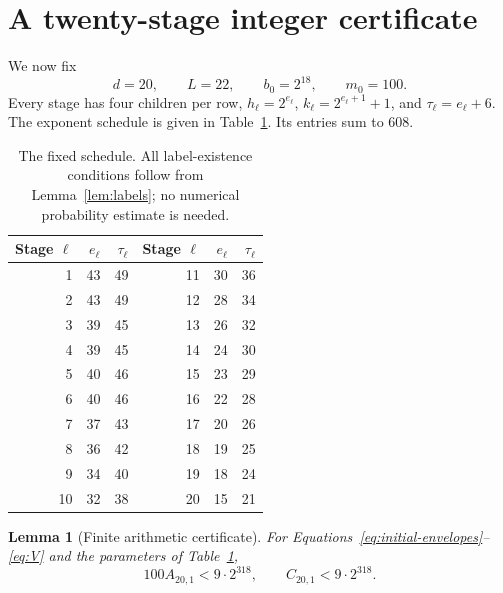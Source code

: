 \documentclass[11pt]{article}
\newtheorem{lemma}[theorem]{Lemma}
\theoremstyle{definition}
\theoremstyle{remark}
\begin{document}
\section{A twenty-stage integer certificate}
\label{sec:certificate}

We now fix
\begin{equation}
 d=20,\qquad L=22,\qquad b_0=2^{18},\qquad m_0=100.
 \label{eq:parameters}
\end{equation}
Every stage has four children per row, $h_\ell=2^{e_\ell}$,
$k_\ell=2^{e_\ell+1}+1$, and $\tau_\ell=e_\ell+6$.
The exponent schedule is given in Table~\ref{tab:parameters}.
Its entries sum to $608$.

\begin{table}[htbp]
\centering
\begin{tabular}{@{}rrrrrr@{}}
\toprule
Stage $\ell$ & $e_\ell$ & $\tau_\ell$
  & Stage $\ell$ & $e_\ell$ & $\tau_\ell$\\
\midrule
1 &43&49&11&30&36\\
2 &43&49&12&28&34\\
3 &39&45&13&26&32\\
4 &39&45&14&24&30\\
5 &40&46&15&23&29\\
6 &40&46&16&22&28\\
7 &37&43&17&20&26\\
8 &36&42&18&19&25\\
9 &34&40&19&18&24\\
10&32&38&20&15&21\\
\bottomrule
\end{tabular}
\caption{The fixed schedule.  All label-existence conditions follow from
Lemma~\ref{lem:labels}; no numerical probability estimate is needed.}
\label{tab:parameters}
\end{table}

\begin{lemma}[Finite arithmetic certificate]
\label{lem:arithmetic}
For Equations~\eqref{eq:initial-envelopes}--\eqref{eq:V} and the
parameters of Table~\ref{tab:parameters},
\begin{equation}
       100A_{20,1}<9\cdot2^{318},\qquad
       C_{20,1}<9\cdot2^{318}.
 \label{eq:finite-inequalities}
\end{equation}
\end{lemma}
\end{document}
